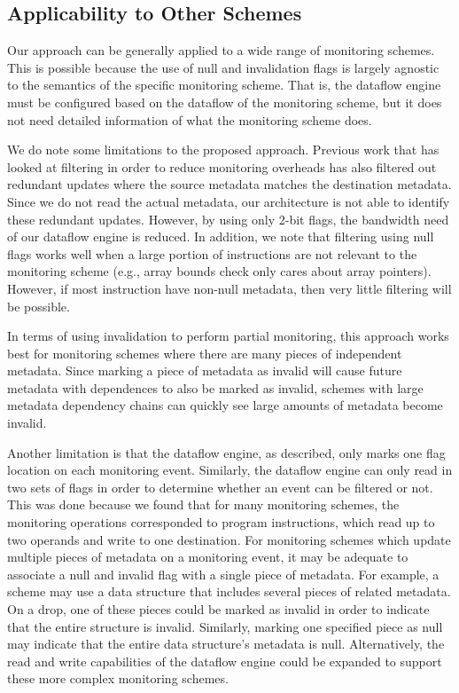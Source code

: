 \subsection{Applicability to Other Schemes}

Our approach can be generally applied to a wide range of monitoring schemes. This
is possible because the use of null and invalidation flags is largely agnostic
to the semantics of the specific monitoring scheme. That is, the dataflow
engine must be configured based on the dataflow of the monitoring scheme, but
it does not need detailed information of what the monitoring scheme does. 

We do note some limitations to the proposed approach. Previous work
\cite{fade-hpca14} that has looked at filtering in order to reduce monitoring
overheads has also filtered out redundant updates where the source metadata
matches the destination metadata. Since we do not read the actual metadata, our
architecture is not able to identify these redundant updates. However, by using
only 2-bit flags, the bandwidth need of our dataflow engine is reduced.  
In addition, we note that filtering using null flags works well when a large
portion of instructions are not relevant to the monitoring scheme (e.g., array
bounds check only cares about array pointers). However, if most instruction
have non-null metadata, then very little filtering will be possible. 

In terms of using invalidation to perform partial monitoring, this 
approach works best for monitoring schemes where there are many pieces of
independent metadata. Since marking a piece of metadata as invalid will cause
future metadata with dependences to also be marked as invalid, schemes with
large metadata dependency chains can quickly see large amounts of metadata
become invalid. 

Another limitation is that the dataflow engine, as described, only marks one
flag location on each monitoring event. Similarly, the dataflow engine can only
read in two sets of flags in order to determine whether an event can be
filtered or not. This was done because we found that for many monitoring
schemes, the monitoring operations corresponded to program instructions, which
read up to two operands and write to one destination. For monitoring schemes
which update multiple pieces of metadata on a monitoring event, it may be
adequate to associate a null and invalid flag with a single piece of metadata.  For
example, a scheme may use a data structure that includes several pieces of
related metadata. On a drop, one of these pieces could be marked as invalid in
order to indicate that the entire structure is invalid.  Similarly, marking one
specified piece as null may indicate that the entire data structure's metadata
is null.  Alternatively, the read and write capabilities of the dataflow
engine could be expanded to support these more complex monitoring schemes.
